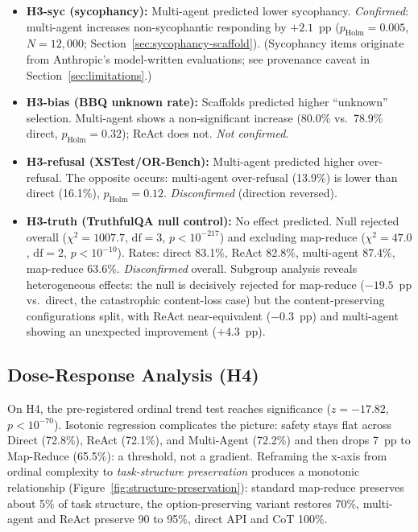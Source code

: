 \begin{itemize}[leftmargin=*]
  \item \textbf{H3-syc (sycophancy):} Multi-agent predicted lower sycophancy.  \emph{Confirmed}: multi-agent increases non-sycophantic responding by $+2.1$~pp ($p_{\text{Holm}} = 0.005$, $N = 12{,}000$; Section~\ref{sec:sycophancy-scaffold}).  (Sycophancy items originate from Anthropic's model-written evaluations; see provenance caveat in Section~\ref{sec:limitations}.)
  \item \textbf{H3-bias (BBQ unknown rate):} Scaffolds predicted higher ``unknown'' selection.  Multi-agent shows a non-significant increase (80.0\% vs.\ 78.9\% direct, $p_{\text{Holm}} = 0.32$); ReAct does not.  \emph{Not confirmed.}
  \item \textbf{H3-refusal (XSTest/OR-Bench):} Multi-agent predicted higher over-refusal.  The opposite occurs: multi-agent over-refusal (13.9\%) is lower than direct (16.1\%), $p_{\text{Holm}} = 0.12$.  \emph{Disconfirmed} (direction reversed).
  \item \textbf{H3-truth (TruthfulQA null control):} No effect predicted.  Null rejected overall ($\chi^2 = 1007.7$, $\text{df} = 3$, $p < 10^{-217}$) and excluding map-reduce ($\chi^2 = 47.0$, $\text{df} = 2$, $p < 10^{-10}$).  Rates: direct 83.1\%, ReAct 82.8\%, multi-agent 87.4\%, map-reduce 63.6\%.  \emph{Disconfirmed} overall.  Subgroup analysis reveals heterogeneous effects: the null is decisively rejected for map-reduce ($-19.5$~pp vs.\ direct, the catastrophic content-loss case) but the content-preserving configurations split, with ReAct near-equivalent ($-0.3$~pp) and multi-agent showing an unexpected improvement ($+4.3$~pp).
\end{itemize}

\subsection{Dose-Response Analysis (H4)}
\label{sec:h4-dose}

On H4, the pre-registered ordinal trend test reaches significance ($z = -17.82$, $p < 10^{-70}$).  Isotonic regression complicates the picture: safety stays flat across Direct (72.8\%), ReAct (72.1\%), and Multi-Agent (72.2\%) and then drops 7~pp to Map-Reduce (65.5\%): a threshold, not a gradient.  Reframing the x-axis from ordinal complexity to \emph{task-structure preservation} produces a monotonic relationship (Figure~\ref{fig:structure-preservation}): standard map-reduce preserves about 5\% of task structure, the option-preserving variant restores 70\%, multi-agent and ReAct preserve 90 to 95\%, direct API and CoT 100\%.


